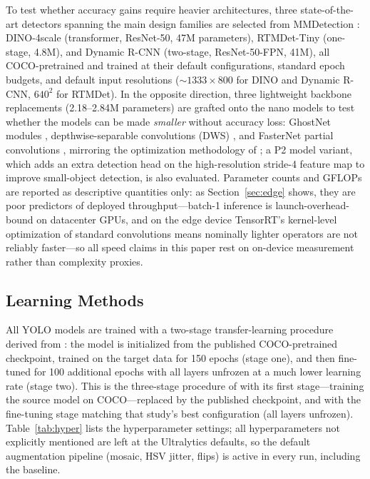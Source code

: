 \documentclass[conference]{IEEEtran}
\begin{document}
To test whether accuracy gains require heavier architectures, three state-of-the-art detectors spanning the main design families are selected from MMDetection \cite{chen2019mmdetection}: DINO-4scale \cite{zhang2023dino} (transformer, ResNet-50, 47M parameters), RTMDet-Tiny \cite{lyu2022rtmdet} (one-stage, 4.8M), and Dynamic R-CNN \cite{zhang2020dynamicrcnn} (two-stage, ResNet-50-FPN, 41M), all COCO-pretrained and trained at their default configurations, standard epoch budgets, and default input resolutions (${\sim}1333{\times}800$ for DINO and Dynamic R-CNN, $640^2$ for RTMDet). In the opposite direction, three lightweight backbone replacements (2.18--2.84M parameters) are grafted onto the nano models to test whether the models can be made \emph{smaller} without accuracy loss: GhostNet modules \cite{han2020ghostnet}, depthwise-separable convolutions (DWS) \cite{howard2017mobilenets}, and FasterNet partial convolutions \cite{chen2023fasternet}, mirroring the optimization methodology of \cite{vazquez2026wildfire}; a P2 model variant, which adds an extra detection head on the high-resolution stride-4 feature map to improve small-object detection, is also evaluated. Parameter counts and GFLOPs are reported as descriptive quantities only: as Section~\ref{sec:edge} shows, they are poor predictors of deployed throughput---batch-1 inference is launch-overhead-bound on datacenter GPUs, and on the edge device TensorRT's kernel-level optimization of standard convolutions means nominally lighter operators are not reliably faster---so all speed claims in this paper rest on on-device measurement rather than complexity proxies.

\subsection{Learning Methods}
\label{sec:learning}
All YOLO models are trained with a two-stage transfer-learning procedure derived from \cite{tsai2025atli}: the model is initialized from the published COCO-pretrained checkpoint, trained on the target data for 150 epochs (stage one), and then fine-tuned for 100 additional epochs with all layers unfrozen at a much lower learning rate (stage two). This is the three-stage procedure of \cite{tsai2025atli} with its first stage---training the source model on COCO---replaced by the published checkpoint, and with the fine-tuning stage matching that study's best configuration (all layers unfrozen). Table~\ref{tab:hyper} lists the hyperparameter settings; all hyperparameters not explicitly mentioned are left at the Ultralytics defaults, so the default augmentation pipeline (mosaic, HSV jitter, flips) is active in every run, including the baseline.
\end{document}
